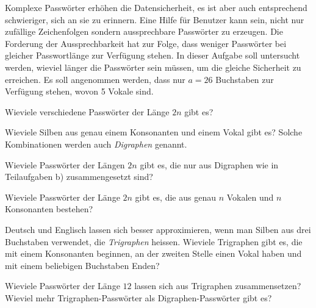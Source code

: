 Komplexe Passwörter erhöhen die Datensicherheit, es ist aber auch
entsprechend schwieriger, sich an sie zu erinnern.
Eine Hilfe für Benutzer kann sein, nicht nur zufällige Zeichenfolgen
sondern aussprechbare Passwörter zu erzeugen.
Die Forderung der Aussprechbarkeit hat zur Folge, dass weniger
Passwörter bei gleicher Passwortlänge zur Verfügung stehen.
In dieser Aufgabe soll untersucht werden, wieviel länger die Passwörter
sein müssen, um die gleiche Sicherheit zu erreichen.
Es soll angenommen werden, dass nur $a=26$ Buchstaben zur Verfügung
stehen, wovon 5 Vokale sind.
\begin{teilaufgaben}
\item
Wieviele verschiedene Passwörter der Länge $2n$ gibt es?
\item
Wieviele Silben aus genau einem Konsonanten und einem Vokal
gibt es?
Solche Kombinationen werden auch {\em Digraphen} genannt.
\item
Wieviele Passwörter der Längen $2n$ gibt es, die nur aus
Digraphen wie in Teilaufgaben b) zusammengesetzt sind?
\item
Wieviele Passwörter der Länge $2n$ gibt es, die aus genau
$n$ Vokalen und $n$ Konsonanten bestehen?
\item
Deutsch und Englisch lassen sich besser approximieren, wenn man
Silben aus drei Buchstaben verwendet, die {\em Trigraphen} heissen.
Wieviele Trigraphen gibt es, die mit einem Konsonanten beginnen,
an der zweiten Stelle einen Vokal haben und mit einem beliebigen
Buchstaben Enden?
\item
Wieviele Passwörter der Länge $12$ lassen sich aus Trigraphen
zusammensetzen?
Wieviel mehr Trigraphen-Passwörter als Digraphen-Passwörter gibt es?
\end{teilaufgaben}

